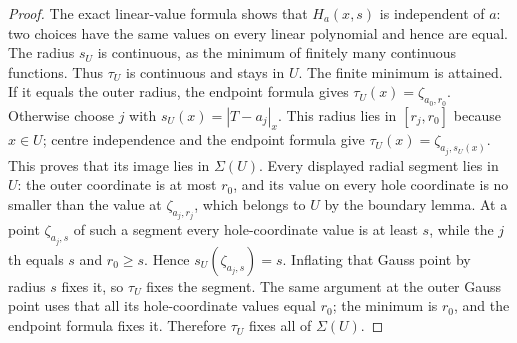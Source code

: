 \begin{proof}
The exact linear-value formula shows that $H_a(x,s)$ is independent of $a$:
two choices have the same values on every linear polynomial and hence are
equal. The radius $s_U$ is continuous, as the minimum of finitely many
continuous functions. Thus $\tau_U$ is continuous and stays in $U$.
The finite minimum is attained. If it equals the outer radius, the endpoint
formula gives $\tau_U(x)=\zeta_{a_0,r_0}$. Otherwise choose $j$ with
$s_U(x)=|T-a_j|_x$. This radius lies in $[r_j,r_0]$ because $x\in U$;
centre independence and the endpoint formula give
$\tau_U(x)=\zeta_{a_j,s_U(x)}$. This proves that its image lies in $\Sigma(U)$.
Every displayed radial segment lies in $U$: the outer coordinate is at most
$r_0$, and its value on every hole coordinate is no smaller than the value
at $\zeta_{a_j,r_j}$, which belongs to $U$ by the boundary lemma.
At a point $\zeta_{a_j,s}$ of such a segment every hole-coordinate value is
at least $s$, while the $j$th equals $s$ and $r_0\ge s$. Hence
$s_U(\zeta_{a_j,s})=s$. Inflating that Gauss point by radius $s$ fixes it,
so $\tau_U$ fixes the segment. The same argument at the outer Gauss point
uses that all its hole-coordinate values equal $r_0$; the minimum is $r_0$,
and the endpoint formula fixes it. Therefore $\tau_U$ fixes all of $\Sigma(U)$.
\end{proof}
